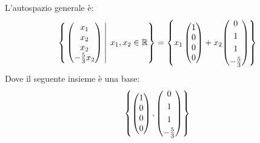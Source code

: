 \documentclass[a4paper]{article}
\makeatletter
\newenvironment{rowequmat}[1]{\left(\array{@{}#1@{}}}{\endarray\right)}
\makeatother
\begin{document}
	L'autospazio generale è:
	\begin{equation*}
		\left\{
			\left. \begin{pmatrix}
				x_{1} \\
				x_{2} \\
				x_{2} \\
				-\frac{5}{3}x_{2}
			\end{pmatrix} \: \right| \:
			x_{1}, x_{2} \in \mathbb{R}
		\right\} = \left\{x_{1}
		\begin{pmatrix}
			1 \\
			0 \\
			0 \\
			0
		\end{pmatrix} + x_{2}
		\begin{rowequmat}{c}
			0 \\ [.3em]
			1 \\ [.3em]
			1 \\ [.3em]
			-\frac{5}{3}
		\end{rowequmat}
		\right\}
	\end{equation*}
	Dove il seguente insieme è una base:
	\begin{equation*}
		\left\{
			\begin{pmatrix}
				1 \\
				0 \\
				0 \\
				0
			\end{pmatrix} ,
			\begin{rowequmat}{c}
				0 \\ [.3em]
				1 \\ [.3em]
				1 \\ [.3em]
				-\frac{5}{3}
			\end{rowequmat}
		\right\}
	\end{equation*}\newpage
\end{document}
